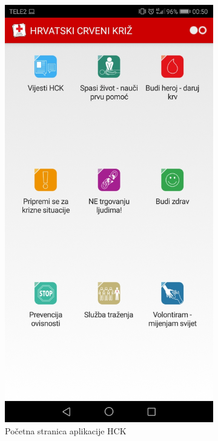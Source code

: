{\begin{figure}[h!]
\begin{subfigure}[b]{0.3\linewidth}
					\includegraphics[scale=0.1]{./slike/crv1.jpg}
					\caption{\tiny Početna stranica aplikacije HCK}
					\label{fig:sub-first}
				\end{subfigure}
				\begin{subfigure}[b]{0.3\linewidth}

\end{subfigure}
\end{figure}}
